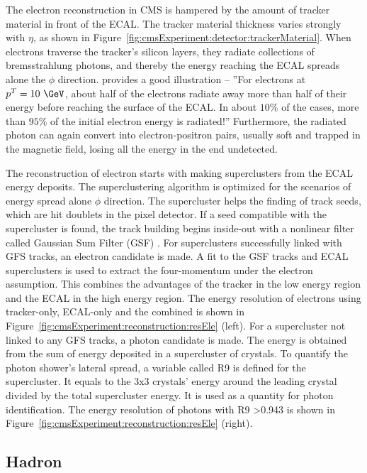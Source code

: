 The electron reconstruction in CMS is hampered by the amount of tracker material in front of the ECAL. The tracker material thickness varies strongly with $\eta$, as shown in Figure~\ref{fig:cmsExperiment:detector:trackerMaterial}. When electrons traverse the tracker's silicon layers, they radiate collections of bremsstrahlung photons, and thereby the energy reaching the ECAL spreads alone the $\phi$ direction. \cite{cms:tdr1:Bayatian:2006nff} provides a good illustration -- ''For electrons at $p^T=10~\GeV$, about half of the electrons radiate away more than half of their energy before reaching the surface of the ECAL. In about $10\%$ of the cases, more than $95\%$ of the initial electron energy is radiated!'' Furthermore, the radiated photon can again convert into electron-positron pairs, usually soft and trapped in the magnetic field, losing all the energy in the end undetected.

The reconstruction of electron starts with making superclusters from the ECAL energy deposits. The superclustering algorithm is optimized for the scenarios of energy spread alone $\phi$ direction. The supercluster helps the finding of track seeds, which are hit doublets in the pixel detector. If a seed compatible with the supercluster is found, the track building begins inside-out with a nonlinear filter called Gaussian Sum Filter (GSF) \cite{tech:gsf:Adam:2005bya}. For superclusters successfully linked with GFS tracks, an electron candidate is made. A fit to the GSF tracks and ECAL superclusters is used to extract the four-momentum under the electron assumption. This combines the advantages of the tracker in the low energy region and the ECAL in the high energy region. The energy resolution of electrons using tracker-only, ECAL-only and the combined is shown in Figure~\ref{fig:cmsExperiment:reconstruction:resEle} (left). For a supercluster not linked to any GFS tracks, a photon candidate is made. The energy is obtained from the sum of energy deposited in a supercluster of crystals. To quantify the photon shower's lateral spread, a variable called R9 is defined for the supercluster. It equals to the 3x3 crystals' energy around the leading crystal divided by the total supercluster energy. It is used as a quantity for photon identification. The energy resolution of photons with R9 >0.943 is shown in Figure~\ref{fig:cmsExperiment:reconstruction:resEle} (right).



\subsection{Hadron}
\label{sec:cmsExperiment:reconstruction:hadron}

